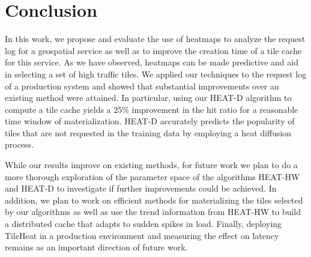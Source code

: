 \documentclass[11pt, oneside]{report}
\begin{document}
{%



\section{Conclusion}
In this work, we propose and evaluate the use of heatmaps to analyze the request log for a geospatial service as well as to improve the creation time of a tile cache for this service. 
As we have observed, heatmaps can be made predictive and aid in selecting a set of high traffic tiles. We applied our techniques to the request log of a production system and showed that substantial improvements over an existing method were attained. In particular, using our HEAT-D algorithm to compute a tile cache yields a $25\%$ improvement in the hit ratio for a reasonable time window of materialization. HEAT-D accurately predicts the popularity of tiles that are not requested in the training data by employing a heat diffusion process. 

While our results improve on existing methods, for future work we plan to do a more thorough exploration of the parameter space of the algorithms HEAT-HW and HEAT-D to investigate if further improvements could be achieved. In addition, we plan to work on efficient methods for materializing the tiles selected by our algorithms as well as use the trend information from HEAT-HW to build a distributed cache that adapts to sudden spikes in load. 
Finally, deploying TileHeat in a production environment and measuring the effect on latency remains as an important direction of future work.


}
\end{document}
